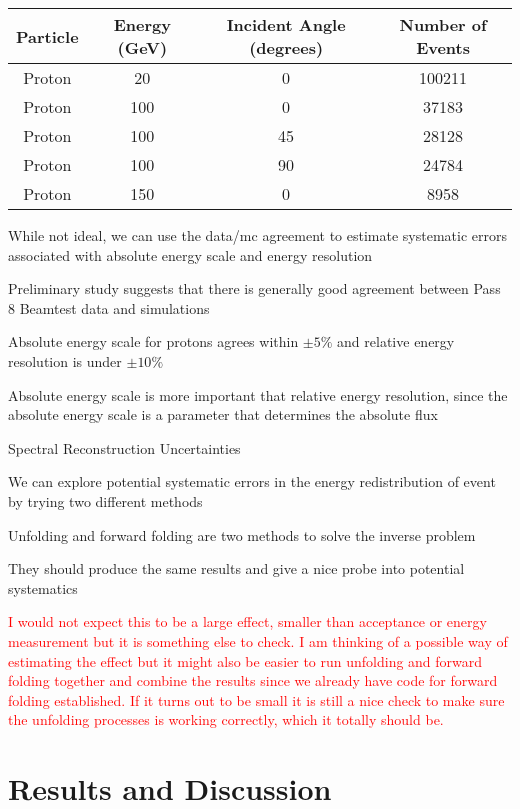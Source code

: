 \documentclass{article}
\begin{document}
\begin{myEnumerate}
\begin{myEnumerate}
\begin{myEnumerate}
\begin{myEnumerate}
  \begin{tabular}{| c | c | c | c |}
    \hline
    Particle & Energy (GeV) & Incident Angle (degrees) & Number of Events \\ \hline
    Proton & 20 & 0 & 100211 \\ \hline
    Proton & 100 & 0 & 37183 \\ \hline
    Proton & 100 & 45 & 28128 \\ \hline
    Proton & 100 & 90 & 24784 \\ \hline
    Proton & 150 & 0  & 8958\\ \hline
  \end{tabular}
  					\item While not ideal, we can use the data/mc agreement to estimate systematic errors associated with absolute energy scale and energy resolution
  					\item Preliminary study suggests that there is generally good agreement between Pass 8 Beamtest data and simulations
  					\item Absolute energy scale for protons agrees within $\pm 5\%$ and relative energy resolution is under $\pm 10\%$
  					\item Absolute energy scale is more important that relative energy resolution, since the absolute energy scale is a parameter that determines the absolute flux
				\end{myEnumerate}
			\end{myEnumerate}
			\item Spectral Reconstruction Uncertainties
			\begin{myEnumerate}
				\item We can explore potential systematic errors in the energy redistribution of event by trying two different methods
				\item Unfolding and forward folding are two methods to solve the inverse problem
				\item They should produce the same results and give a nice probe into potential systematics
				\item \textcolor{red}{I would not expect this to be a large effect, smaller than acceptance or energy measurement but it is something else to check.  I am thinking of a possible way of estimating the effect but it might also be easier to run unfolding and forward folding together and combine the results since we already have code for forward folding established.  If it turns out to be small it is still a nice check to make sure the unfolding processes is working correctly, which it totally should be.}
			\end{myEnumerate}
		\end{myEnumerate}
	\end{myEnumerate}
\section{Results and Discussion}
	\begin{myEnumerate}
		\item 
	\end{myEnumerate}
\end{document}

